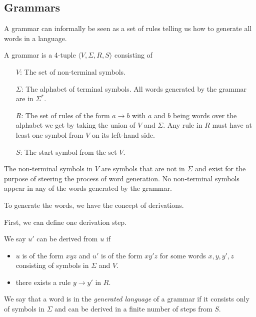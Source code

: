 \subsection{Grammars}\label{subsec:grammars}

A grammar can informally be seen as a set of rules telling us how to generate all words in a language.

\begin{define}[Grammar]
    A grammar is a 4-tuple $\langle V, \Sigma, R, S \rangle$ consisting of
    \begin{itemize}
        \item[$V$:] The set of non-terminal symbols.
        \item[$\Sigma$:] The alphabet of terminal symbols.
        All words generated by the grammar are in $\Sigma^{*}$.
        \item[$R$:] The set of rules of the form $a \to b$ with $a$ and $b$ being words over the alphabet we get by taking the union of $V$ and $\Sigma$.
        Any rule in $R$ must have at least one symbol from $V$ on its left-hand side.
        \item[$S$:] The start symbol from the set $V$.
    \end{itemize}
\end{define}

The non-terminal symbols in $V$ are symbols that are not in $\Sigma$ and exist for the purpose of steering the process of word generation.
No non-terminal symbols appear in any of the words generated by the grammar.

To generate the words, we have the concept of derivations.
\begin{define}[Derivation]
    First, we can define one derivation step.

    We say $u'$ can be derived from $u$ if
    \begin{itemize}
        \setlength\itemsep{0.2em}
        \item $u$ is of the form $xyz$ and $u'$ is of the form $xy'z$ for some words $x, y, y', z$ consisting of symbols in $\Sigma$ and $V$.
        \item there exists a rule $y \to y'$ in $R$.
    \end{itemize}

    We say that a word is in the \emph{generated language} of a grammar if it consists only of symbols in $\Sigma$ and can be derived in a finite number of steps from $S$.
\end{define}


